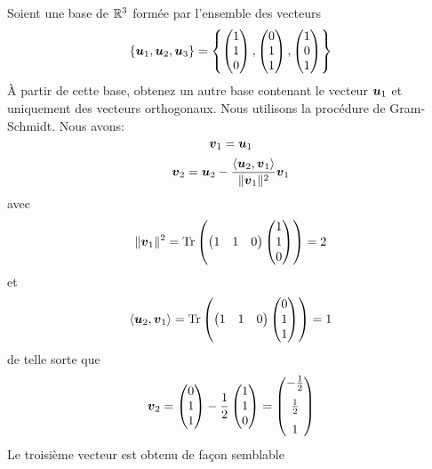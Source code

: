\begin{exemple}\label{ex:orthog}
Soient une base de $\mathbb{R}^3$ formée par l'ensemble des vecteurs
\[
\left\{ \boldsymbol{u}_1,\boldsymbol{u}_2,\boldsymbol{u}_3 \right\} =
\left\{ \begin{pmatrix}
1 \\ 1 \\ 0
\end{pmatrix} ,  \begin{pmatrix}
0 \\ 1 \\ 1
\end{pmatrix},  \begin{pmatrix}
1 \\ 0 \\ 1
\end{pmatrix}
\right\}
\]
À partir de cette base, obtenez un autre base contenant le vecteur $\boldsymbol{u}_1$ et
uniquement des vecteurs orthogonaux. 
\solution
Nous utilisons la procédure de Gram-Schmidt.  Nous avons:
\[
\boldsymbol{v}_1 = \boldsymbol{u}_1
\]
\[
\boldsymbol{v}_2 = \boldsymbol{u}_2 - \frac{\langle\boldsymbol{u}_2, \boldsymbol{v}_1\rangle}{\lVert\boldsymbol{v}_1\rVert^2}\boldsymbol{v}_1
\] 
avec
\[
\lVert\boldsymbol{v}_1\rVert^2 = \operatorname{Tr}\left(\begin{pmatrix}
1 & 1 & 0
\end{pmatrix}\begin{pmatrix}
1 \\ 1 \\ 0
\end{pmatrix}\right) = 2
\]
et
\[
\langle\boldsymbol{u}_2, \boldsymbol{v}_1\rangle = \operatorname{Tr}\left(\begin{pmatrix}
1 & 1 & 0
\end{pmatrix}\begin{pmatrix}
0 \\ 1 \\ 1
\end{pmatrix}\right) = 1
\]
de telle sorte que
\[
\boldsymbol{v}_2 = \begin{pmatrix}
0 \\ 1 \\ 1
\end{pmatrix} - \frac12 \begin{pmatrix}
1 \\ 1 \\ 0
\end{pmatrix} =
 \begin{pmatrix}
-\frac12 \\[7pt] \frac12 \\[7pt] 1
\end{pmatrix}
\]
\pagebreak
Le troisième vecteur est obtenu de façon semblable

\end{exemple}
